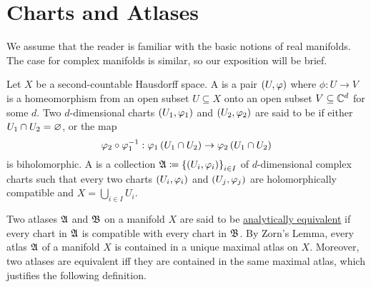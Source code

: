 \documentclass[../Moduli_Spaces_of_Riemann_Surfaces.tex]{subfiles}
\begin{document}
    \section{Charts and Atlases}
    We assume that the reader is familiar with the basic notions of real manifolds. The case for complex manifolds is similar, so our exposition will be brief.
    \begin{definition}
        Let $X$ be a second-countable Hausdorff space. A   is a pair $\tpl{U,\phi}$ where $\phi:U\to V$ is a homeomorphism from an open subset $U\subseteq X$ onto an open subset $V\subseteq\C^d$ for some $d$. Two $d$-dimensional charts $\l(U_1,\phi_1\r)$ and $\l(U_2,\phi_2\r)$ are said to be  if either $U_1\cap U_2=\em$, or the map
        \begin{equation*}
            \phi_2\circ\phi_1^{-1}:\phi_1\l(U_1\cap U_2\r)\to\phi_2\l(U_1\cap U_2\r)
        \end{equation*}
        is biholomorphic. A  is a collection $\mf{A}\coloneqq\l\{\l(U_i,\phi_i\r)\r\}_{i\in I}$ of $d$-dimensional complex charts such that every two charts $\l(U_i,\phi_i\r)$ and $\l(U_j,\phi_j\r)$ are holomorphically compatible and $X=\bigcup_{i\in I}U_i$.
    \end{definition}
    \begin{remark}
        Two atlases $\mf{A}$ and $\mf{B}$ on a manifold $X$ are said to be \ul{analytically equivalent} if every chart in $\mf{A}$ is compatible with every chart in $\mf{B}$. By Zorn's Lemma, every atlas $\mf{A}$ of a manifold $X$ is contained in a unique maximal atlas on $X$. Moreover, two atlases are equivalent iff they are contained in the same maximal atlas, which justifies the following definition.\exqed
    \end{remark}
\end{document}
